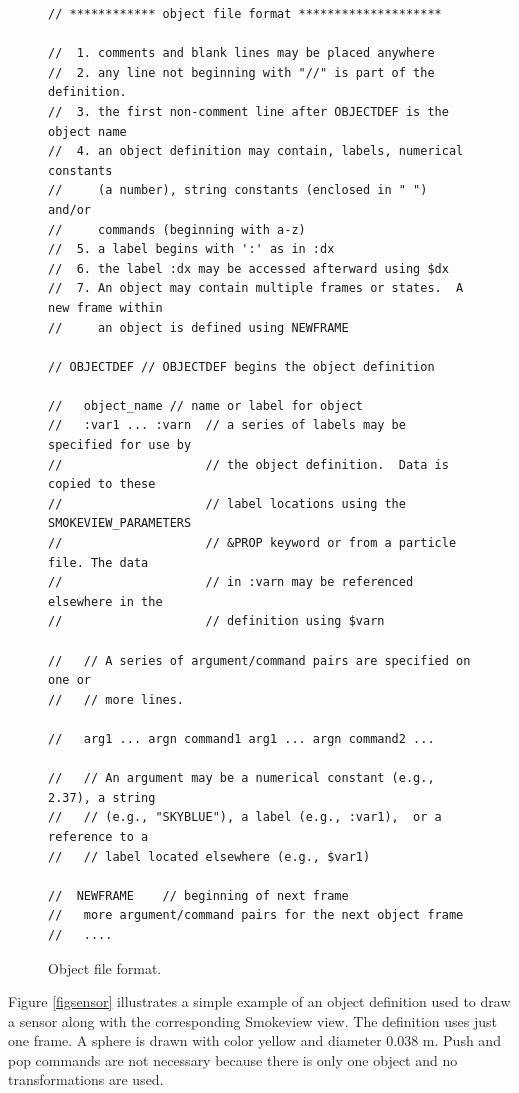 \documentclass[11pt,twoside]{book}
\begin{document}
\begin{figure}[\figoptions]
{\small
\begin{lstlisting}[frame=single,rulecolor=\color{yellow},
framerule=1pt,framesep=1pc,fillcolor=\color{yellow}]
// ************ object file format ********************

//  1. comments and blank lines may be placed anywhere
//  2. any line not beginning with "//" is part of the definition.
//  3. the first non-comment line after OBJECTDEF is the object name
//  4. an object definition may contain, labels, numerical constants
//     (a number), string constants (enclosed in " ") and/or
//     commands (beginning with a-z)
//  5. a label begins with ':' as in :dx
//  6. the label :dx may be accessed afterward using $dx
//  7. An object may contain multiple frames or states.  A new frame within
//     an object is defined using NEWFRAME

// OBJECTDEF // OBJECTDEF begins the object definition

//   object_name // name or label for object
//   :var1 ... :varn  // a series of labels may be specified for use by
//                    // the object definition.  Data is copied to these
//                    // label locations using the SMOKEVIEW_PARAMETERS
//                    // &PROP keyword or from a particle file. The data
//                    // in :varn may be referenced  elsewhere in the
//                    // definition using $varn

//   // A series of argument/command pairs are specified on one or
//   // more lines.

//   arg1 ... argn command1 arg1 ... argn command2 ...

//   // An argument may be a numerical constant (e.g., 2.37), a string
//   // (e.g., "SKYBLUE"), a label (e.g., :var1),  or a reference to a
//   // label located elsewhere (e.g., $var1)

//  NEWFRAME    // beginning of next frame
//   more argument/command pairs for the next object frame
//   ....
\end{lstlisting}
}
\caption{Object file format.}
\label{figobjectdef}%
\end{figure}

Figure \ref{figsensor} illustrates a simple example of an object definition used to draw a sensor along with the corresponding Smokeview view. The definition uses just one frame. A sphere is drawn with color yellow and diameter 0.038 m. Push and pop commands are not necessary because there is only one object and no transformations are used.
\end{document}
